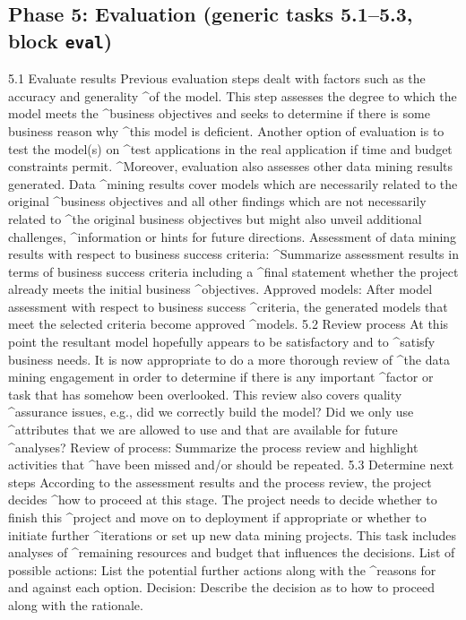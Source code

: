 \subsection*{Phase 5: Evaluation (generic tasks 5.1--5.3, block \texttt{eval})}
\begin{AppCPrompt}
5.1 Evaluate results
Previous evaluation steps dealt with factors such as the accuracy and generality
\AppCCont@^of the model. This step assesses the degree to which the model meets the
\AppCCont@^business objectives and seeks to determine if there is some business reason why
\AppCCont@^this model is deficient. Another option of evaluation is to test the model(s) on
\AppCCont@^test applications in the real application if time and budget constraints permit.
\AppCCont@^Moreover, evaluation also assesses other data mining results generated. Data
\AppCCont@^mining results cover models which are necessarily related to the original
\AppCCont@^business objectives and all other findings which are not necessarily related to
\AppCCont@^the original business objectives but might also unveil additional challenges,
\AppCCont@^information or hints for future directions.
Assessment of data mining results with respect to business success criteria:
\AppCCont@^Summarize assessment results in terms of business success criteria including a
\AppCCont@^final statement whether the project already meets the initial business
\AppCCont@^objectives.
Approved models: After model assessment with respect to business success
\AppCCont@^criteria, the generated models that meet the selected criteria become approved
\AppCCont@^models.
5.2 Review process
At this point the resultant model hopefully appears to be satisfactory and to
\AppCCont@^satisfy business needs. It is now appropriate to do a more thorough review of
\AppCCont@^the data mining engagement in order to determine if there is any important
\AppCCont@^factor or task that has somehow been overlooked. This review also covers quality
\AppCCont@^assurance issues, e.g., did we correctly build the model? Did we only use
\AppCCont@^attributes that we are allowed to use and that are available for future
\AppCCont@^analyses?
Review of process: Summarize the process review and highlight activities that
\AppCCont@^have been missed and/or should be repeated.
5.3 Determine next steps
According to the assessment results and the process review, the project decides
\AppCCont@^how to proceed at this stage. The project needs to decide whether to finish this
\AppCCont@^project and move on to deployment if appropriate or whether to initiate further
\AppCCont@^iterations or set up new data mining projects. This task includes analyses of
\AppCCont@^remaining resources and budget that influences the decisions.
List of possible actions: List the potential further actions along with the
\AppCCont@^reasons for and against each option.
Decision: Describe the decision as to how to proceed along with the rationale.
\end{AppCPrompt}
